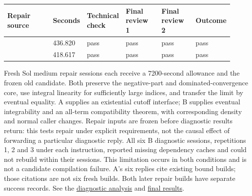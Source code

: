 \begingroup\small\setlength{\tabcolsep}{3pt}\renewcommand{\arraystretch}{1.14}
\par\nopagebreak\medskip\noindent\begin{minipage}[t]{\linewidth}
\begin{tabular}{>{\raggedright\arraybackslash}p{0.23\linewidth}>{\raggedright\arraybackslash}p{0.11\linewidth}>{\raggedright\arraybackslash}p{0.13\linewidth}>{\raggedright\arraybackslash}p{0.17\linewidth}>{\raggedright\arraybackslash}p{0.16\linewidth}>{\raggedright\arraybackslash}p{0.12\linewidth}}
\toprule
\textbf{Repair source} & \textbf{Seconds} & \textbf{Technical check} & \textbf{Final review 1} & \textbf{Final review 2} & \textbf{Outcome}\\\midrule

{A} & {436.820} & {pass} & {pass} & {pass} & {pass}\\
{B} & {418.617} & {pass} & {pass} & {pass} & {pass}\\
\bottomrule\end{tabular}\end{minipage}\par\medskip\endgroup
Fresh Sol medium repair sessions each receive a 7200-second allowance and the frozen old candidate. Both preserve the negative-part and dominated-convergence core, use integral linearity for sufficiently large indices, and transfer the limit by eventual equality. A supplies an existential cutoff interface; B supplies eventual integrability and an all-term compatibility theorem, with corresponding density and normal caller changes. Repair inputs are frozen before diagnostic results return: this tests repair under explicit requirements, not the causal effect of forwarding a particular diagnostic reply. All six B diagnostic sessions, repetitions 1, 2 and 3 under each instruction, reported missing dependency caches and could not rebuild within their sessions. This limitation occurs in both conditions and is not a candidate compilation failure. A's six replies cite existing bound builds; those citations are not six fresh builds. Both later repair builds have separate success records. See the \href{verification/revision23/analysis/L3_INTERPRETATION.zh-CN.md}{diagnostic analysis} and \href{verification/revision23/RESULTS.json}{final results}.

